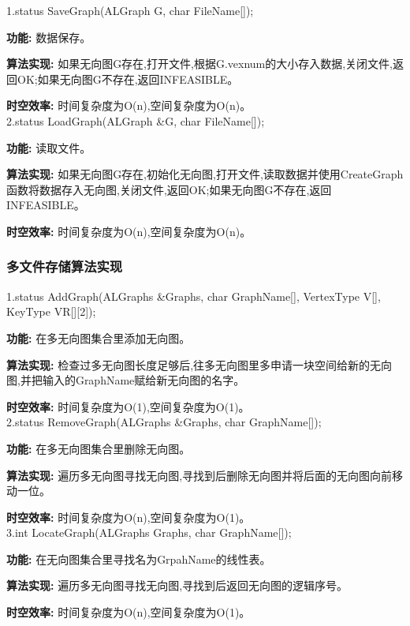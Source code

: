 \documentclass[supercite]{Experimental_Report}
\theoremstyle{definition}
\begin{document}
1.status SaveGraph(ALGraph G, char FileName[]);

\textbf{功能: }数据保存。

\textbf{算法实现: }如果无向图G存在,打开文件,根据G.vexnum的大小存入数据,关闭文件,返回OK;如果无向图G不存在,返回INFEASIBLE。

\textbf{时空效率: }时间复杂度为O(n),空间复杂度为O(n)。\\

2.status LoadGraph(ALGraph \&G, char FileName[]);

\textbf{功能: }读取文件。

\textbf{算法实现: }如果无向图G存在,初始化无向图,打开文件,读取数据并使用CreateGraph函数将数据存入无向图,关闭文件,返回OK;如果无向图G不存在,返回INFEASIBLE。

\textbf{时空效率: }时间复杂度为O(n),空间复杂度为O(n)。\\

\subsubsection{多文件存储算法实现}

1.status AddGraph(ALGraphs \&Graphs, char GraphName[], VertexType V[], KeyType VR[][2]);

\textbf{功能: }在多无向图集合里添加无向图。

\textbf{算法实现: }检查过多无向图长度足够后,往多无向图里多申请一块空间给新的无向图,并把输入的GraphName赋给新无向图的名字。

\textbf{时空效率: }时间复杂度为O(1),空间复杂度为O(1)。\\

2.status RemoveGraph(ALGraphs \&Graphs, char GraphName[]);

\textbf{功能: }在多无向图集合里删除无向图。

\textbf{算法实现: }遍历多无向图寻找无向图,寻找到后删除无向图并将后面的无向图向前移动一位。

\textbf{时空效率: }时间复杂度为O(n),空间复杂度为O(1)。\\

3.int LocateGraph(ALGraphs Graphs, char GraphName[]);

\textbf{功能: }在无向图集合里寻找名为GrpahName的线性表。

\textbf{算法实现: }遍历多无向图寻找无向图,寻找到后返回无向图的逻辑序号。

\textbf{时空效率: }时间复杂度为O(n),空间复杂度为O(1)。\\
\end{document}
